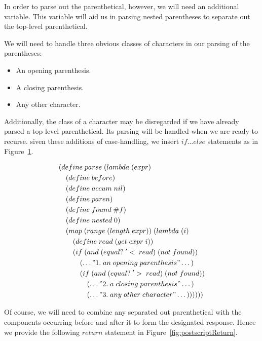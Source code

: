 In order to parse out the parenthetical, however, we will need an additional variable. 
This variable will aid us in parsing nested parentheses to separate out the top-level parenthetical.

We will need to handle three obvious classes of characters in our parsing of the parentheses:

\begin{itemize}
  \item An opening parenthesis.
  \item A closing parenthesis.
  \item Any other character.
\end{itemize}

Additionally, the class of a character may be disregarded if we have already
parsed a top-level parenthetical. Its parsing will be handled when we are ready
to recurse. siven these additions of case-handling, we insert $if \dots else$
statements as in Figure~\ref{fig:imperParseApproach}.

\begin{figure}[htp]
\footnotesize
\caption{}\label{fig:imperParseApproach}
\begin{align*}
& (define \; parse \; (lambda \; (expr) \; 
\\& \quad (define \; before)
\\& \quad (define \; accum \; nil)
\\& \quad (define \; paren)
\\& \quad (define \; found \; \#f)
\\& \quad (define \; nested \; 0)
\\& \quad (map \; (range \; (length \; expr)) \; (lambda \; (i)
\\& \qquad (define \; read \; (get \; expr \; i))
\\& \qquad (if \; (and \; (equal? \; '< \; read) \; (not \; found))
\\& \qquad \quad (\dots"1. \; an \; opening \; parenthesis"\dots)
\\& \qquad \quad (if \; (and \; (equal? \; '> \; read) \; (not \; found))
\\& \qquad \qquad (\dots"2. \; a \; closing \; parenthesis"\dots)
\\& \qquad \qquad (\dots"3. \; any \; other \; character"\dots))))))
\end{align*}
\end{figure}

Of course, we will need to combine any separated out parenthetical with the components 
occurring before and after it to form the designated response. Hence we provide the 
following $return$ statement in Figure~\ref{fig:postscriptReturn}.

